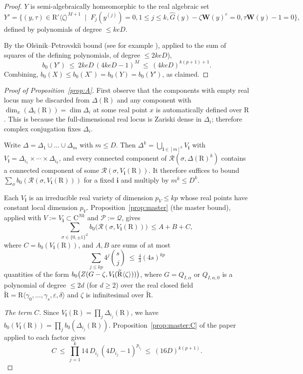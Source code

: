 \documentclass[10pt]{amsart}
\theoremstyle{definition}
\theoremstyle{remark}
\numberwithin{equation}{section}
\newcommand {\R} {\mathrm{R}}
\newcommand {\C}     {\mathrm{C}}
\newcommand {\ZZ} {{\rm Z}}
\newcommand {\RR} {{\mathcal R}}
\newcommand{\Rz}{\R'\langle\zeta\rangle}
\newcommand{\Rt}{\widetilde{\R}}
\newcommand{\bW}{\mathbf{W}}
\newcommand{\bi}{\mathbf{i}}
\begin{document}
\begin{proof}
$Y$ is semi-algebraically homeomorphic to the real algebraic set
\[
Y'=\bigl\{(y,\tau)\in\Rz^{M+1}\; \mid \; F_j(y^{(j)})=0, 1\leq j\leq k, \widehat G(y)-\zeta\bW(y)^e=0,\tau\bW(y)-1=0\bigr\},
\]
defined by polynomials of degree $\le keD$. 

By the Ole\u{\i}nik--Petrovski\u{\i} bound 
 (see for example \cite[Proposition 7.28]{BPRbook2}),
 applied to the sum of squares of the defining polynomials, of degree $\le 2keD$),
\[
b_0(Y')\ \le\ 2keD\,(4keD-1)^{M}\ \le\ (4keD)^{k(p+1)+1}.
\]
Combining, $b_0(X)\le b_0(X^\circ)=b_0(Y)=b_0(Y')$, as claimed.
\end{proof}


\begin{proof}[Proof of Proposition~\ref{prop:A}]
First observe that
the components with empty real locus may be discarded from 
$\Delta(\R)$
and any component with 
$\dim_x(\Delta_i(\R)) = \dim \Delta_i$ at some real point $x$ is automatically defined over $\R$.
This is because the full-dimensional real locus is Zariski dense in \(\Delta_i\); therefore complex conjugation fixes \(\Delta_i\).



Write $\Delta=\Delta_1\cup\dots\cup\Delta_m$ with $m\le D$. Then $\Delta^k=\bigcup_{\bi\in[m]^k}V_\bi$ with $V_\bi=\Delta_{i_1}\times\cdots\times\Delta_{i_k}$, and every connected component of $\RR(\sigma,\Delta(\R)^k)$ contains a connected component of some $\RR(\sigma,V_\bi(\R))$. It therefore suffices to bound $\sum_\sigma b_0(\RR(\sigma,V_\bi(\R)))$ for a fixed $\bi$ and multiply by $m^k\le D^k$.

Each $V_\bi$ is an irreducible real variety of dimension $p_V\le kp$ whose real points have constant local dimension $p_V$. 
Proposition~\ref{prop:master}
(the master bound), applied with $V:=V_\bi\subset\C^{Nk}$ and $\mathcal{P}:=\mathcal{Q}$, gives
\[
\sum_{\sigma\in\{0,\pm1\}^\mathcal{Q}} b_0\bigl(\RR(\sigma,V_\bi(\R))\bigr)\ \leq A+B+C,
\]
where $C=b_0(V_\bi(\R))$, and $A,B$ are sums of at most
\[
\sum_{j\le kp}4^j\binom{s}{j}\ \le\ \tfrac43(4s)^{kp}
\]
quantities of the form $b_0\bigl(\ZZ(G-\zeta,V_\bi(\Rt\langle\zeta\rangle))\bigr)$, where $G=Q_{I,\alpha}$ or $Q_{I,\alpha,0}$ is a polynomial of degree $\leq 2d$ (for $d \geq 2$) over the real closed field $\Rt=\R\langle\gamma_0,\dots,\gamma_s,\varepsilon,\delta\rangle$ and $\zeta$ is infinitesimal over $\Rt$.

\emph{The term $C$.} Since $V_\bi(\R)=\prod_j\Delta_{i_j}(\R)$, we have $b_0(V_\bi(\R))=\prod_jb_0(\Delta_{i_j}(\R))$. Proposition~\ref{prop:master:C} of the paper applied to each factor gives
\[
C\ \le\ \prod_{j=1}^k 14\,D_{i_j}\,(4D_{i_j}-1)^{p_{i_j}}\ \le\ (16D)^{k(p+1)}.
\]


\end{proof}
\end{document}
